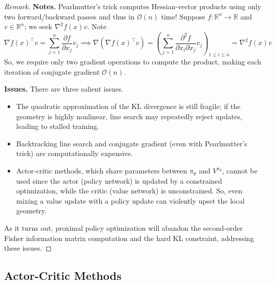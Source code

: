 \documentclass[11pt, letterpaper]{article}
\let\leq\leqslant
\newenvironment{remark}
    {\renewcommand\qedsymbol{\(\blacksquare\)}\begin{proof}[Remark]}
    {\end{proof}}
\begin{document}
\begin{remark}
    \textbf{Notes.} Pearlmutter's trick computes Hessian-vector products using only two forward/backward passes and thus in \(\mathcal{O}(n)\) time! Suppose \(f : \mathbb{R}^n \to \mathbb{R}\) and \(v \in \mathbb{R}^n\); we seek \(\nabla^2 f(x) v\). Note 
    \[
        \nabla f(x)^\top v = \sum_{j=1}^n \frac{\partial f}{\partial x_j} v_j
        \implies
        \nabla (\nabla f(x)^\top v) 
        = \left( \sum_{j=1}^n \frac{\partial^2 f}{\partial x_i \partial x_j} v_j \right)_{1 \leq i \leq n}
        = \nabla^2 f(x) v
    \]
    So, we require only two gradient operations to compute the product, making each iteration of conjugate gradient \(\mathcal{O}(n)\). 

    \textbf{Issues.} There are three salient issues. 
    \begin{itemize}
        \item The quadratic approximation of the KL divergence is still fragile; if the geometry is highly nonlinear, line search may repeatedly reject updates, leading to stalled training.
        \item Backtracking line search and conjugate gradient (even with Pearlmutter's trick) are computationally expensive. 
        \item Actor-critic methods, which share parameters between \(\pi_\theta\) and \(V^{\pi_\theta}\), cannot be used since the actor (policy network) is updated by a constrained optimization, while the critic (value network) is unconstrained. So, even mixing a value update with a policy update can violently upset the local geometry. 
    \end{itemize}
    As it turns out, proximal policy optimization will abandon the second-order Fisher information matrix computation and the hard KL constraint, addressing these issues. 
\end{remark}

\subsection{Actor-Critic Methods}
\end{document}
